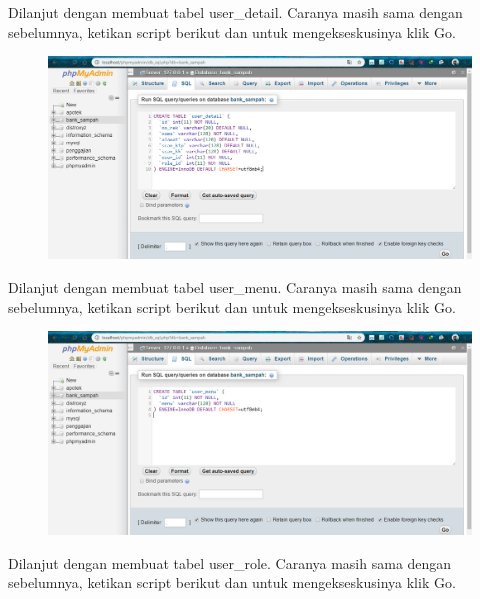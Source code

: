 \noindent
Dilanjut dengan membuat tabel user\_detail. Caranya masih sama dengan sebelumnya, ketikan script berikut dan untuk mengekseskusinya klik Go.



\begin{figure}[H]
\centering
\includegraphics[width=1\textwidth]{figures/database/11.png}
\end{figure}

\noindent
Dilanjut dengan membuat tabel user\_menu. Caranya masih sama dengan sebelumnya, ketikan script berikut dan untuk mengekseskusinya klik Go.



\begin{figure}[H]
\centering
\includegraphics[width=1\textwidth]{figures/database/12.png}
\end{figure}

\noindent
Dilanjut dengan membuat tabel user\_role. Caranya masih sama dengan sebelumnya, ketikan script berikut dan untuk mengekseskusinya klik Go.



